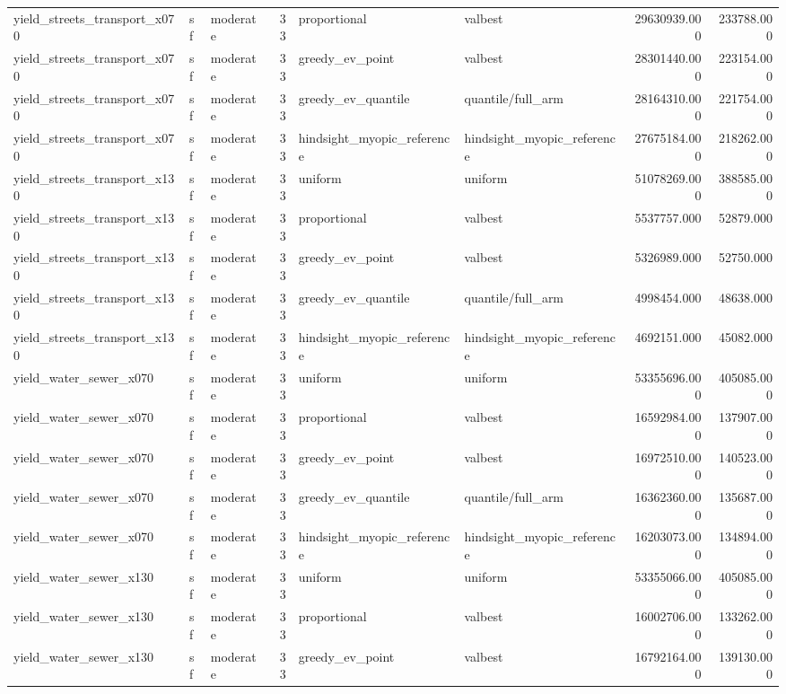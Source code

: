 \begin{tabular}{lllrllrr}
yield\_streets\_transport\_x070 & sf & moderate & 33 & proportional & valbest & 29630939.000 & 233788.000 \\
yield\_streets\_transport\_x070 & sf & moderate & 33 & greedy\_ev\_point & valbest & 28301440.000 & 223154.000 \\
yield\_streets\_transport\_x070 & sf & moderate & 33 & greedy\_ev\_quantile & quantile/full\_arm & 28164310.000 & 221754.000 \\
yield\_streets\_transport\_x070 & sf & moderate & 33 & hindsight\_myopic\_reference & hindsight\_myopic\_reference & 27675184.000 & 218262.000 \\
yield\_streets\_transport\_x130 & sf & moderate & 33 & uniform & uniform & 51078269.000 & 388585.000 \\
yield\_streets\_transport\_x130 & sf & moderate & 33 & proportional & valbest & 5537757.000 & 52879.000 \\
yield\_streets\_transport\_x130 & sf & moderate & 33 & greedy\_ev\_point & valbest & 5326989.000 & 52750.000 \\
yield\_streets\_transport\_x130 & sf & moderate & 33 & greedy\_ev\_quantile & quantile/full\_arm & 4998454.000 & 48638.000 \\
yield\_streets\_transport\_x130 & sf & moderate & 33 & hindsight\_myopic\_reference & hindsight\_myopic\_reference & 4692151.000 & 45082.000 \\
yield\_water\_sewer\_x070 & sf & moderate & 33 & uniform & uniform & 53355696.000 & 405085.000 \\
yield\_water\_sewer\_x070 & sf & moderate & 33 & proportional & valbest & 16592984.000 & 137907.000 \\
yield\_water\_sewer\_x070 & sf & moderate & 33 & greedy\_ev\_point & valbest & 16972510.000 & 140523.000 \\
yield\_water\_sewer\_x070 & sf & moderate & 33 & greedy\_ev\_quantile & quantile/full\_arm & 16362360.000 & 135687.000 \\
yield\_water\_sewer\_x070 & sf & moderate & 33 & hindsight\_myopic\_reference & hindsight\_myopic\_reference & 16203073.000 & 134894.000 \\
yield\_water\_sewer\_x130 & sf & moderate & 33 & uniform & uniform & 53355066.000 & 405085.000 \\
yield\_water\_sewer\_x130 & sf & moderate & 33 & proportional & valbest & 16002706.000 & 133262.000 \\
yield\_water\_sewer\_x130 & sf & moderate & 33 & greedy\_ev\_point & valbest & 16792164.000 & 139130.000 \\

\end{tabular}

